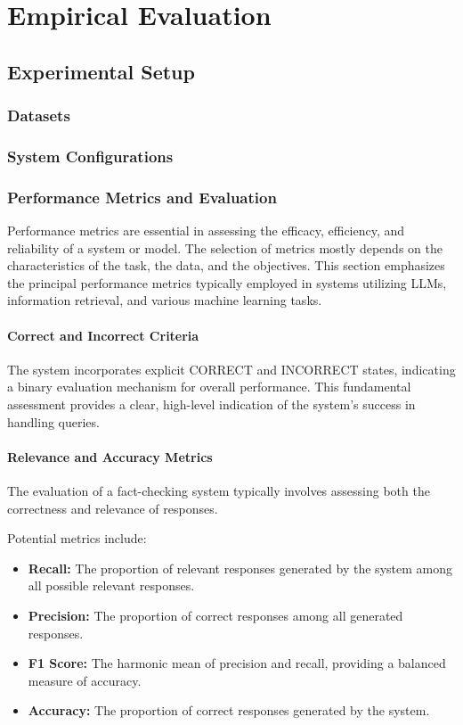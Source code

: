 \chapter{Empirical Evaluation}\label{ch:empirical-evaluation}

\section{Experimental Setup}\label{sec:empirical-evaluation:experimental-setup}
\subsection{Datasets}\label{subsec:empirical-evaluation:experimental-setup:datasets}
\subsection{System Configurations}\label{subsec:empirical-evaluation:experimental-setup:system-configurations}
\subsection{Performance Metrics and Evaluation}\label{subsec:empirical-evaluation:experimental-setup:performance-metrics-and-evaluation}
Performance metrics are essential in assessing the efficacy, efficiency, and reliability of a system or model.
The selection of metrics mostly depends on the characteristics of the task, the data, and the objectives.
This section emphasizes the principal performance metrics typically employed in systems utilizing LLMs, information retrieval, and various machine learning tasks.
\subsubsection{Correct and Incorrect Criteria}
The system incorporates explicit CORRECT and INCORRECT states, indicating a binary evaluation mechanism for overall performance.
This fundamental assessment provides a clear, high-level indication of the system's success in handling queries.
\subsubsection{Relevance and Accuracy Metrics}
The evaluation of a fact-checking system typically involves assessing both the correctness and relevance of responses.

Potential metrics include:
\begin{itemize}
    \item \textbf{Recall:} The proportion of relevant responses generated by the system among all possible relevant responses.
    \item \textbf{Precision:} The proportion of correct responses among all generated responses.
    \item \textbf{F1 Score:} The harmonic mean of precision and recall, providing a balanced measure of accuracy.
    \item \textbf{Accuracy:} The proportion of correct responses generated by the system.
\end{itemize}
